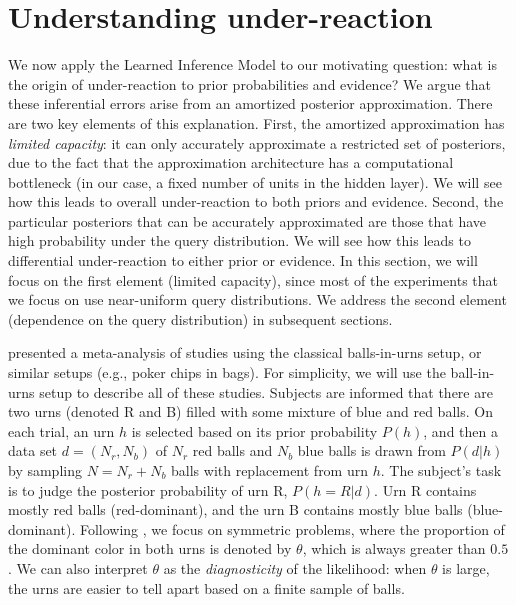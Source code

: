 \section{Understanding under-reaction}

We now apply the Learned Inference Model to our motivating question: what is the origin of under-reaction to prior probabilities and evidence? We argue that these inferential errors arise from an amortized posterior approximation. There are two key elements of this explanation. First, the amortized approximation has \emph{limited capacity}: it can only accurately approximate a restricted set of posteriors, due to the fact that the approximation architecture has a computational bottleneck (in our case, a fixed number of units in the hidden layer). We will see how this leads to overall under-reaction to both priors and evidence. Second, the particular posteriors that can be accurately approximated are those that have high probability under the query distribution. We will see how this leads to differential under-reaction to either prior or evidence. In this section, we will focus on the first element (limited capacity), since most of the experiments that we focus on use near-uniform query distributions. We address the second element (dependence on the query distribution) in subsequent sections.

\citet{benjamin18} presented a meta-analysis of studies using the classical balls-in-urns setup, or similar setups (e.g., poker chips in bags). For simplicity, we will use the ball-in-urns setup to describe all of these studies. Subjects are informed that there are two urns (denoted R and B) filled with some mixture of blue and red balls. On each trial, an urn $h$ is selected based on its prior probability $P(h)$, and then a data set $d = (N_r,N_b)$ of $N_r$ red balls and $N_b$ blue balls is drawn from $P(d|h)$ by sampling $N = N_r+N_b$ balls with replacement from urn $h$. The subject's task is to judge the posterior probability of urn R, $P(h=R|d)$. Urn R contains mostly red balls (red-dominant), and the urn B contains mostly blue balls (blue-dominant). Following \citet{benjamin18}, we focus on symmetric problems, where the proportion of the dominant color in both urns is denoted by $\theta$, which is always greater than $0.5$. We can also interpret $\theta$ as the \emph{diagnosticity} of the likelihood: when $\theta$ is large, the urns are easier to tell apart based on a finite sample of balls.

